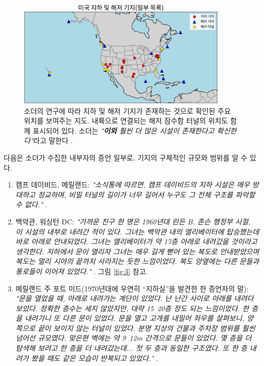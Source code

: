 \documentclass[10pt,twocolumn,letterpaper]{article}
\begin{document}
\begin{figure}[t]
\begin{center}
\includegraphics[width=0.9\textwidth]{baseskor.png}
\end{center}
   \caption{소더의 연구에 따라 지하 및 해저 기지가 존재하는 것으로 확인된 주요 위치를 보여주는 지도. 내륙으로 연결되는 해저 잠수함 터널의 위치도 함께 표시되어 있다. 소더는 \textit{"\textbf{이외} 훨씬 더 많은 시설이 존재한다고 확신한다"}라고 말한다 \cite{22}.}
   \label{fig:4}
\end{figure}

다음은 소더가 수집한 내부자의 증언 일부로, 기지의 구체적인 규모와 범위를 알 수 있다.

\begin{flushleft}
\begin{enumerate}
    \item 캠프 데이비드, 메릴랜드: \textit{"소식통에 따르면, 캠프 데이비드의 지하 시설은 매우 방대하고 정교하며, 비밀 터널의 길이가 너무 길어서 누구도 그 전체 구조를 파악할 수 없다."} \cite{22}.
    \item 백악관, 워싱턴 DC: \textit{"가까운 친구 한 명은 1960년대 린든 B. 존슨 행정부 시절, 이 시설의 내부로 내려간 적이 있다. 그녀는 백악관 내의 엘리베이터에 탑승했는데 바로 아래로 안내되었다. 그녀는 엘리베이터가 약 17층 아래로 내려갔을 것이라고 생각한다. 지하에서 문이 열리자 그녀는 매우 길게 뻗어 있는 복도로 안내받았으며 복도는 멀리 시야의 끝까지 사라지는 듯한 느낌이었다. 복도 양옆에는 다른 문들과 통로들이 이어져 있었다."} \cite{22}. 그림 \ref{fig:3} 참고.
    \item 메릴랜드 주 포트 미드(1970년대에 우연히 “지하실”을 발견한 한 증언자의 말): \textit{"문을 열었을 때, 아래로 내려가는 계단이 있었다. 난 난간 사이로 아래를 내려다보았다. 정확한 층수는 세지 않았지만, 대략 15~20층 정도 되는 느낌이었다. 한 층을 내려가니 또 다른 문이 있었다. 문을 열고 고개를 내밀어 좌우를 살펴보니, 양쪽으로 끝이 보이지 않는 터널이 있었다. 분명 지상의 건물과 주차장 범위를 훨씬 넘어선 규모였다. 맞은편 벽에는 약 9~12m 간격으로 문들이 있었다. 몇 층을 더 탐색해 보려고 한 층을 더 내려갔는데... 첫 두 층과 동일한 구조였다. 또 한 층 내려가 봤을 때도 같은 모습이 반복되고 있었다."} \cite{22}.
\end{enumerate}
\end{flushleft}
\end{document}
